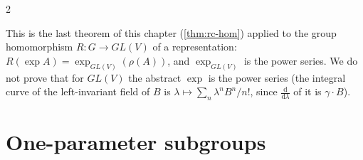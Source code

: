 \begin{paracol}{2}
\begin{coursenote}
This is the last theorem of this chapter (\cref{thm:rc-hom}) applied to the group homomorphism $R\colon G\to GL(V)$ of a representation: $R(\exp A)=\exp_{GL(V)}(\rho(A))$, and $\exp_{GL(V)}$ is the power series. We do not prove that for $GL(V)$ the abstract $\exp$ is the power series (the integral curve of the left-invariant field of $B$ is $\lambda\mapsto\sum_n\lambda^nB^n/n!$, since $\frac{\mathrm d}{\mathrm d\lambda}$ of it is $\gamma\cdot B$). 
\end{coursenote}

\section{One-parameter subgroups}\label{sec:rc-1ps}


\end{paracol}
